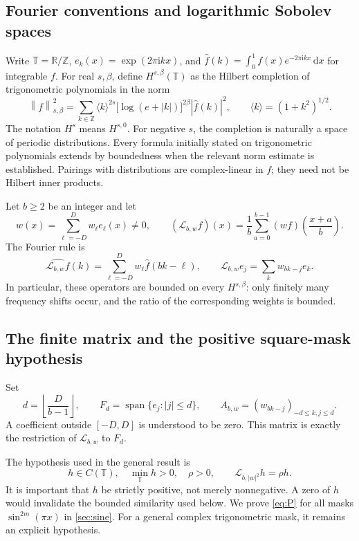 \documentclass[11pt,a4paper]{article}
\theoremstyle{definition}
\theoremstyle{remark}
\newcommand{\R}{\mathbb R}
\newcommand{\Z}{\mathbb Z}
\newcommand{\T}{\mathbb T}
\newcommand{\dd}{\,\mathrm d}
\newcommand{\ii}{\mathrm i}
\newcommand{\Lop}{\mathcal L}
\newcommand{\Span}{\operatorname{span}}
\newcommand{\norm}[1]{\left\lVert#1\right\rVert}
\newcommand{\br}[1]{\langle#1\rangle}
\numberwithin{equation}{section}
\begin{document}
\subsection{Fourier conventions and logarithmic Sobolev spaces}
Write $\T=\R/\Z$, $e_k(x)=\exp(2\pi\ii kx)$, and
$\widehat f(k)=\int_0^1f(x)e^{-2\pi\ii kx}\dd x$ for integrable $f$.
For real $s,\beta$, define $H^{s,\beta}(\T)$ as the Hilbert completion of
trigonometric polynomials in the norm
\begin{equation}
 \norm f_{s,\beta}^2=
 \sum_{k\in\Z}\br{k}^{2s}\bigl[\log(e+|k|)\bigr]^{2\beta}
       |\widehat f(k)|^2,\qquad \br{k}=(1+k^2)^{1/2}.
 \label{eq:Hsb}
\end{equation}
The notation $H^s$ means $H^{s,0}$. For negative $s$, the completion is
naturally a space of periodic distributions. Every formula initially stated
on trigonometric polynomials extends by boundedness when the relevant norm
estimate is established. Pairings with distributions are complex-linear in
$f$; they need not be Hilbert inner products.

Let $b\ge2$ be an integer and let
\begin{equation}
 w(x)=\sum_{\ell=-D}^{D}w_\ell e_\ell(x)\ne0,
 \qquad
 (\Lop_{b,w}f)(x)=\frac1b\sum_{a=0}^{b-1}
       (wf)\!\left(\frac{x+a}{b}\right).
 \label{eq:general-L}
\end{equation}
The Fourier rule is
\begin{equation}
 \widehat{\Lop_{b,w}f}(k)
   =\sum_{\ell=-D}^{D}w_\ell\widehat f(bk-\ell),
 \qquad
 \Lop_{b,w}e_j=\sum_k w_{bk-j}e_k.
 \label{eq:Fourier-rule}
\end{equation}
In particular, these operators are bounded on every $H^{s,\beta}$: only
finitely many frequency shifts occur, and the ratio of the corresponding
weights is bounded.

\subsection{The finite matrix and the positive square-mask hypothesis}
Set
\begin{equation}
 d=\left\lfloor\frac D{b-1}\right\rfloor,\qquad
 F_d=\Span\{e_j:|j|\le d\},\qquad
 A_{b,w}=(w_{bk-j})_{-d\le k,j\le d}.
 \label{eq:finite-matrix}
\end{equation}
A coefficient outside $[-D,D]$ is understood to be zero. This matrix is
exactly the restriction of $\Lop_{b,w}$ to $F_d$.

The hypothesis used in the general result is
\begin{equation*}
 h\in C(\T),\quad \min_\T h>0,\quad \rho>0,\qquad
 \Lop_{b,|w|^2}h=\rho h.
 \tag{P}\label{eq:P}
\end{equation*}
It is important that $h$ be strictly positive, not merely nonnegative.
A zero of $h$ would invalidate the bounded similarity used below.
We prove \eqref{eq:P} for all masks $\sin^{2m}(\pi x)$ in \cref{sec:sine}.
For a general complex trigonometric mask, it remains an explicit hypothesis.
\end{document}
